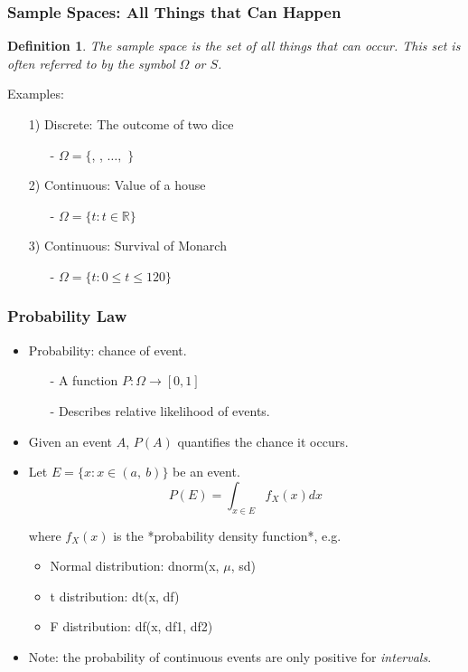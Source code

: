 \documentclass[aspectratio=169, handout]{beamer}
\def\die#1{{\domino#1}}
\newtheorem{defn}{Definition}
\numberwithin{equation}{section}
\begin{document}
\begin{frame}
\frametitle{Sample Spaces: All Things that Can Happen}

\begin{defn}
The \alert{sample space} is the set of all things that can occur.  This set is often referred to by the symbol $\Omega$ or $S$.
\end{defn}
\pause 
{Examples: } \pause 
\begin{itemize}
\item[1)] Discrete: The outcome of two dice 
\begin{itemize}
\item[-] $\Omega = \{$\die1\die1, \die1\die2 ,  $\hdots,$ \die6\die6$ \}$ \pause
\end{itemize}
\item[2)] Continuous: Value of a house
\begin{itemize}
\item[-] $\Omega = \{t: t\in \mathbb{R}\}$ 
\end{itemize}
\item[3)] Continuous: Survival of Monarch 
\begin{itemize}
\item[-] $\Omega = \{t: 0\leq t \leq 120\}$ 
\end{itemize}

\end{itemize}
\end{frame}


\begin{frame}
\frametitle{Probability Law}
\begin{itemize}
\item \alert{Probability}: chance of event.
\begin{itemize}
\item[-] A function $P: \Omega \rightarrow [0,1]$
\item[-] Describes relative likelihood of events.
\end{itemize}
\item Given an event $A$, $P(A)$ quantifies the chance it occurs.
\item Let $E=\{x : x \in(a,\ b)\}$ be an event.
$$P(E)=\int_{x \in E} f_X(x) dx$$
\item[] where $f_X(x)$ is the *probability density function*, e.g.
\begin{itemize}
\item Normal distribution: dnorm(x, $\mu$, sd)
\item t distribution: dt(x, df)
\item F distribution: df(x, df1, df2)
\end{itemize}
\item Note: the probability of continuous events are only positive for \emph{intervals}.
\end{itemize}
\end{frame}
\end{document}
